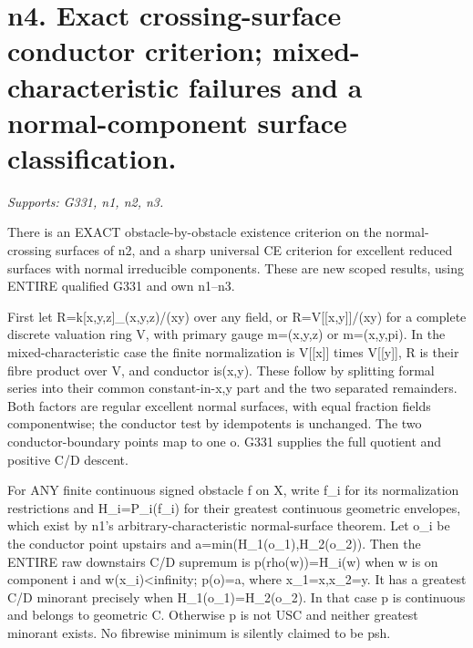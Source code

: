 \documentclass[11pt]{article}
\begin{document}
\section{n4. Exact crossing-surface conductor criterion; mixed-characteristic failures and a normal-component surface classification.}
\textit{Supports: G331, n1, n2, n3.}

There is an EXACT obstacle-by-obstacle existence criterion on the normal-crossing surfaces of n2, and a sharp universal CE criterion for excellent reduced surfaces with normal irreducible components. These are new scoped results, using ENTIRE qualified G331 and own n1--n3.

First let R=k[x,y,z]\_(x,y,z)/(xy) over any field, or R=V[[x,y]]/(xy) for a complete discrete valuation ring V, with primary gauge m=(x,y,z) or m=(x,y,pi). In the mixed-characteristic case the finite normalization is V[[x]] times V[[y]], R is their fibre product over V, and conductor is(x,y). These follow by splitting formal series into their common constant-in-x,y part and the two separated remainders. Both factors are regular excellent normal surfaces, with equal fraction fields componentwise; the conductor test by idempotents is unchanged. The two conductor-boundary points map to one o. G331 supplies the full quotient and positive C/D descent.

For ANY finite continuous signed obstacle f on X, write f\_i for its normalization restrictions and H\_i=P\_i(f\_i) for their greatest continuous geometric envelopes, which exist by n1's arbitrary-characteristic normal-surface theorem. Let o\_i be the conductor point upstairs and a=min(H\_1(o\_1),H\_2(o\_2)). Then the ENTIRE raw downstairs C/D supremum is
p(rho(w))=H\_i(w) when w is on component i and w(x\_i)\textless{}infinity; p(o)=a,
where x\_1=x,x\_2=y. It has a greatest C/D minorant precisely when H\_1(o\_1)=H\_2(o\_2). In that case p is continuous and belongs to geometric C. Otherwise p is not USC and neither greatest minorant exists. No fibrewise minimum is silently claimed to be psh.
\end{document}
